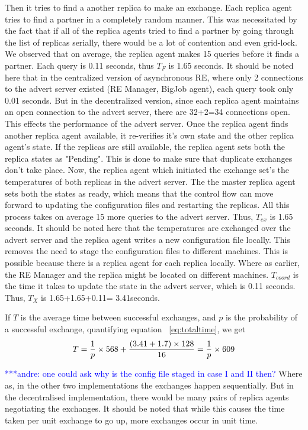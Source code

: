 \documentclass{rspublic}
\newcommand{\alnote}[1]{ {\textcolor{blue} { ***andre: #1 }}}
\newcommand{\alnote}[1]{}
\begin{document}
Then it tries to find a another replica to make an exchange. Each
replica agent tries to find a partner in a completely random
manner. This was necessitated by the fact that if all of the replica
agents tried to find a partner by going through the list of replicas
serially, there would be a lot of contention and even grid-lock. We
observed that on average, the replica agent makes 15 queries before it
finds a partner. Each query is 0.11 seconds, thus $T_F$ is 1.65
seconds. It should be noted here that in the centralized version of
asynchronous RE, where only 2 connections to the advert server existed
(RE Manager, BigJob agent), each query took only 0.01 seconds. But in
the decentralized version, since each replica agent maintains an open
connection to the advert server, there are 32+2=34 connections
open. This effects the performance of the advert server. Once the
replica agent finds another replica agent available, it re-verifies
it's own state and the other replica agent's state. If the replicas
are still available, the replica agent sets both the replica states as
"Pending". This is done to make sure that duplicate exchanges don't
take place. Now, the replica agent which initiated the exchange set's
the temperatures of both replicas in the advert server. The the master
replica agent sets both the states as ready, which means that the
control flow can move forward to updating the configuration files and
restarting the replicas. All this process takes on average 15 more
queries to the advert server. Thus, $T_{ex}$ is 1.65 seconds. It
should be noted here that the temperatures are exchanged over the
advert server and the replica agent writes a new configuration file
locally. This removes the need to stage the configuration files to
different machines. This is possible because there is a replica agent
for each replica locally. Where as earlier, the RE Manager and the
replica might be located on different machines. $T_{coord}$ is the
time it takes to update the state in the advert server, which is 0.11
seconds. Thus, $T_X$ is 1.65+1.65+0.11= 3.41seconds.

If $T$ is the average time between successful exchanges, and $p$ is
the probability of a successful exchange, quantifying equation
~\ref{eq:totaltime}, we get
\begin{eqnarray}
T=  {1 \over p} \times {568 + {(3.41+1.7)\times 128\over 16}} = {1 \over p} \times 609
\label{eq:timebt}
\end{eqnarray}


\alnote {one could ask why is the config file staged in case I and II
  then?}  Where as, in the other two implementations the exchanges
happen sequentially. But in the decentralised implementation, there
would be many pairs of replica agents negotiating the exchanges. It
should be noted that while this causes the time taken per unit
exchange to go up, more exchanges occur in unit time.
\end{document}
